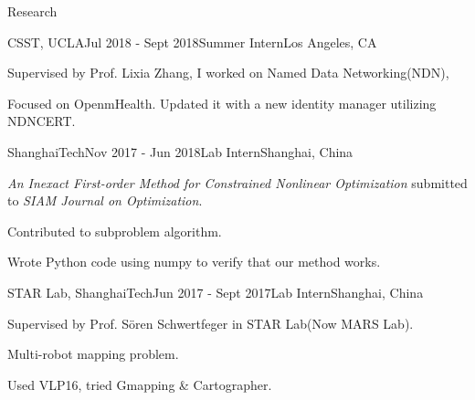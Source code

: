 \documentclass{resume} %
\begin{document}
\begin{rSection}{Research}

\begin{rSubsection}
  {CSST, UCLA}{Jul 2018 - Sept 2018}{Summer Intern}{Los Angeles, CA}
    \item Supervised by Prof. Lixia Zhang, I worked on Named Data Networking(NDN), 
    \item Focused on OpenmHealth. Updated it with a new identity manager utilizing NDNCERT.
\end{rSubsection}


\begin{rSubsection}
  {ShanghaiTech}{Nov 2017 - Jun 2018}{Lab Intern}{Shanghai, China}
    \item \textit{An Inexact First-order Method for Constrained Nonlinear Optimization} submitted to \textit{SIAM Journal on Optimization}.
    \item Contributed to subproblem algorithm.
    \item Wrote Python code using numpy to verify that our method works.
    
\end{rSubsection}


\begin{rSubsection}
  {STAR Lab, ShanghaiTech}{Jun 2017 - Sept 2017}{Lab Intern}{Shanghai, China}
    \item Supervised by Prof. Sören Schwertfeger in STAR Lab(Now MARS Lab).
    \item Multi-robot mapping problem.
    \item Used VLP16, tried Gmapping \& Cartographer.
\end{rSubsection}

\end{rSection}
\end{document}
